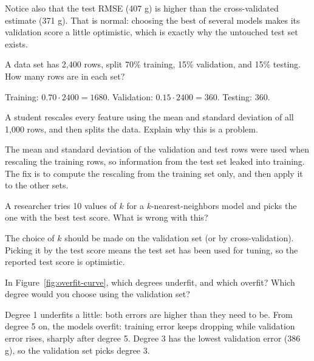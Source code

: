 Notice also that the test RMSE (407 g) is higher than the cross-validated estimate (371 g). That is normal:
choosing the best of several models makes its validation score a little optimistic, which is exactly why the
untouched test set exists.

\begin{Exercise}[label=tvt1, title=Count the rows]
A data set has 2,400 rows, split 70\% training, 15\% validation, and 15\% testing. How many rows are in each
set?
\end{Exercise}
\begin{Answer}[ref=tvt1]
Training: $0.70 \cdot 2400 = 1680$. Validation: $0.15 \cdot 2400 = 360$. Testing: $360$.
\end{Answer}

\begin{Exercise}[label=tvt2, title=Spot the leak]
A student rescales every feature using the mean and standard deviation of all 1,000 rows, and then splits
the data. Explain why this is a problem.
\end{Exercise}
\begin{Answer}[ref=tvt2]
The mean and standard deviation of the validation and test rows were used when rescaling the training rows,
so information from the test set leaked into training. The fix is to compute the rescaling from the training
set only, and then apply it to the other sets.
\end{Answer}

\begin{Exercise}[label=tvt3, title=Which set?]
A researcher tries 10 values of $k$ for a $k$-nearest-neighbors model and picks the one with the best test
score. What is wrong with this?
\end{Exercise}
\begin{Answer}[ref=tvt3]
The choice of $k$ should be made on the validation set (or by cross-validation). Picking it by the test score
means the test set has been used for tuning, so the reported test score is optimistic.
\end{Answer}

\begin{Exercise}[label=tvt4, title=Read the curve]
In Figure~\ref{fig:overfit-curve}, which degrees underfit, and which overfit? Which degree would you choose
using the validation set?
\end{Exercise}
\begin{Answer}[ref=tvt4]
Degree 1 underfits a little: both errors are higher than they need to be. From degree 5 on, the models
overfit: training error keeps dropping while validation error rises, sharply after degree 5. Degree 3 has
the lowest validation error (386 g), so the validation set picks degree 3.
\end{Answer}

